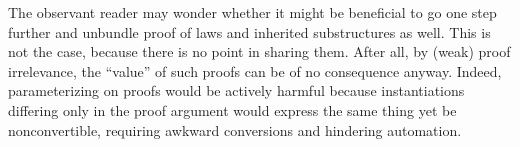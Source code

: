 \documentclass[a4paper,10pt,runningheads]{llncs}
\begin{document}





The observant reader may wonder whether it might be beneficial to go one step further and unbundle proof of laws and inherited substructures as well. This is not the case, because there is no point in sharing them. After all, by (weak) proof irrelevance, the ``value'' of such proofs can be of no consequence anyway. Indeed, parameterizing on proofs would be actively harmful because instantiations differing only in the proof argument would express the same thing yet be nonconvertible, requiring awkward conversions and hindering automation.

\end{document}
